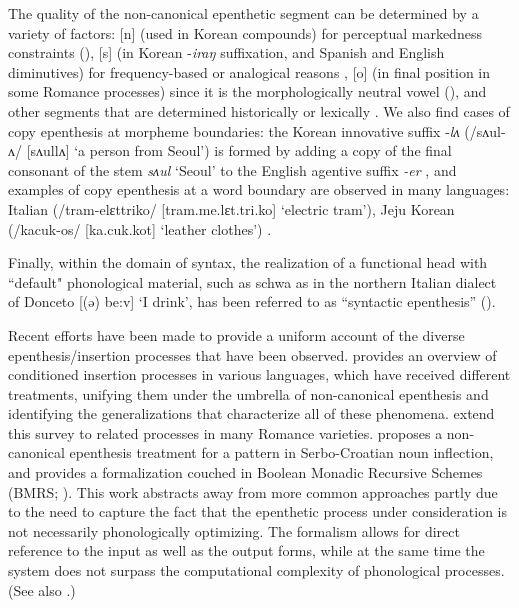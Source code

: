 \documentclass[output=paper,colorlinks,citecolor=brown]{langscibook}
\begin{document}
The quality of the non-canonical epenthetic segment can be determined by a variety of factors: [n] (used in Korean compounds) for perceptual markedness constraints (\citealt{Jun2015,Jun2021}), [s] (in Korean {}-\textit{iraŋ} suffixation, and Spanish and English diminutives) for frequency-based or analogical reasons \citep{Kim2022a}, [o] (in final position in some Romance processes) since it is the morphologically neutral vowel (\citealt{AronoffRepetti2021}), and other segments that are determined historically or lexically \citep{Moradietal2023}. We also find cases of copy epenthesis at morpheme boundaries: the Korean innovative suffix {}-\textit{lʌ} (/sʌul-ʌ/ [sʌullʌ] ‘a person from Seoul’) is formed by adding a copy of the final consonant of the stem \textit{sʌul} ‘Seoul’ to the English agentive suffix \textit{{}-er} \citep{Kim2022c}, and examples of copy epenthesis at a word boundary are observed in many languages: Italian (/tram-elɛttriko/ [tram.me.lɛt.tri.ko] ‘electric tram’), Jeju Korean (/kacuk-os/ [ka.cuk.kot] ‘leather clothes’) \citep{Kim2022a}.

Finally, within the domain of syntax, the realization of a functional head with ``default" phonological material, such as schwa as in the northern Italian dialect of Donceto [(ə) be:v] {}`I drink', has been referred to as “syntactic epenthesis” (\citealt{CardinalettiRepetti2004}).

Recent efforts have been made to provide a uniform account of the diverse epenthesis/insertion processes that have been observed. \citet{Moradi2017} provides an overview of conditioned insertion processes in various languages, which have received different treatments, unifying them under the umbrella of non\hyp canonical epenthesis and identifying the generalizations that characterize all of these phenomena. \citet{AronoffRepetti2021} extend this survey to related processes in many Romance varieties. \citet{Petrovic2023} proposes a non-canonical epenthesis treatment for a pattern in Serbo-Croatian noun inflection, and provides a formalization couched in Boolean Monadic Recursive Schemes (BMRS; \citealt{ChandleeJardine2021}). This work abstracts away from more common approaches partly due to the need to capture the fact that the epenthetic process under consideration is not necessarily phonologically optimizing. The formalism allows for direct reference to the input as well as the output forms, while at the same time the system does not surpass the computational complexity of phonological processes. (See also \citealt{Moradietal2023}.)
\end{document}
